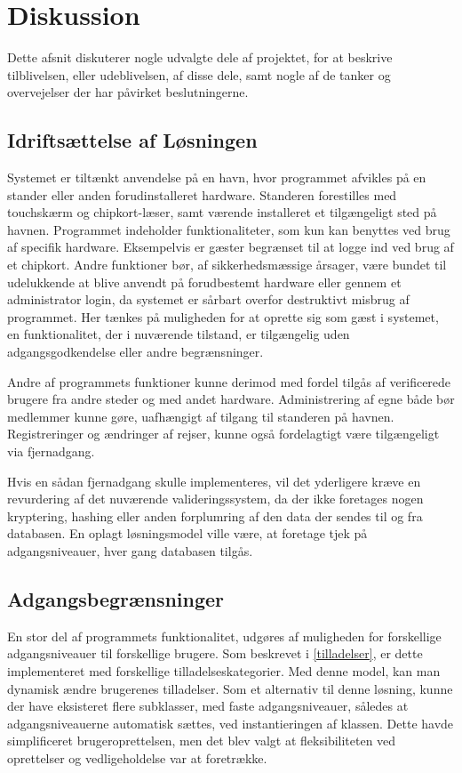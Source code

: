 \chapter{Diskussion}
\label{cha:diskussion}

Dette afsnit diskuterer nogle udvalgte dele af projektet, for at beskrive tilblivelsen, eller udeblivelsen, af disse dele, samt nogle af de tanker og overvejelser der har påvirket beslutningerne.

\section{Idriftsættelse af Løsningen} 

Systemet er tiltænkt anvendelse på en havn, hvor programmet afvikles på en stander eller anden forudinstalleret hardware. Standeren forestilles med touchskærm og chipkort-læser, samt værende installeret et tilgængeligt sted på havnen. Programmet indeholder funktionaliteter, som kun kan benyttes ved brug af specifik hardware. Eksempelvis er gæster begrænset til at logge ind ved brug af et chipkort. Andre funktioner bør, af sikkerhedsmæssige årsager, være bundet til udelukkende at blive anvendt på forudbestemt hardware eller gennem et administrator login, da systemet er sårbart overfor destruktivt misbrug af programmet. Her tænkes på muligheden for at oprette sig som gæst i systemet, en funktionalitet, der i nuværende tilstand, er tilgængelig uden adgangsgodkendelse eller andre begrænsninger.

Andre af programmets funktioner kunne derimod med fordel tilgås af verificerede brugere fra andre steder og med andet hardware. Administrering af egne både bør medlemmer kunne gøre, uafhængigt af tilgang til standeren på havnen. Registreringer og ændringer af rejser, kunne også fordelagtigt være tilgængeligt via fjernadgang.

Hvis en sådan fjernadgang skulle implementeres, vil det yderligere kræve en revurdering af det nuværende valideringssystem, da der ikke foretages nogen kryptering, hashing eller anden forplumring af den data der sendes til og fra databasen. En oplagt løsningsmodel ville være, at foretage tjek på adgangsniveauer, hver gang databasen tilgås.

\section{Adgangsbegrænsninger}

En stor del af programmets funktionalitet, udgøres af muligheden for forskellige adgangsniveauer til forskellige brugere. Som beskrevet i \cref{tilladelser}, er dette implementeret med forskellige tilladelseskategorier. Med denne model, kan man dynamisk ændre brugerenes tilladelser. Som et alternativ til denne løsning, kunne der have eksisteret flere subklasser, med faste adgangsniveauer, således at adgangsniveauerne automatisk sættes, ved instantieringen af klassen. Dette havde simplificeret brugeroprettelsen, men det blev valgt at fleksibiliteten ved oprettelser og vedligeholdelse var at foretrække. 

